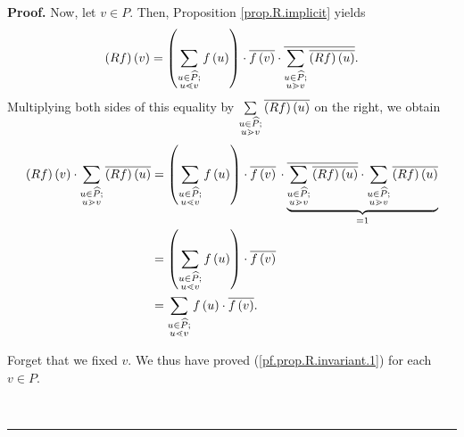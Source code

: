 \documentclass[numbers=enddot,12pt,final,onecolumn,notitlepage]{scrartcl}%
\theoremstyle{definition}
\newenvironment{verlong}{}{}
\newenvironment{proof}[1][Proof]{\noindent\textbf{#1.} }{\ \rule{0.5em}{0.5em}}
\let\sumnonlimits\sum
\renewcommand{\sum}{\sumnonlimits\limits}
\begin{document}
\begin{verlong}
\begin{proof}
Now, let $v\in P$. Then, Proposition \ref{prop.R.implicit} yields%
\[
\left(  Rf\right)  \left(  v\right)  =\left(  \sum\limits_{\substack{u\in
\widehat{P};\\u\lessdot v}}f\left(  u\right)  \right)  \cdot\overline{f\left(
v\right)  }\cdot\overline{\sum\limits_{\substack{u\in\widehat{P};\\u\gtrdot
v}}\overline{\left(  Rf\right)  \left(  u\right)  }}.
\]
Multiplying both sides of this equality by $\sum\limits_{\substack{u\in
\widehat{P};\\u\gtrdot v}}\overline{\left(  Rf\right)  \left(  u\right)  }$ on
the right, we obtain%
\begin{align}
\left(  Rf\right)  \left(  v\right)  \cdot\sum\limits_{\substack{u\in
\widehat{P};\\u\gtrdot v}}\overline{\left(  Rf\right)  \left(  u\right)  }  &
=\left(  \sum\limits_{\substack{u\in\widehat{P};\\u\lessdot v}}f\left(
u\right)  \right)  \cdot\overline{f\left(  v\right)  }\,\cdot
\underbrace{\overline{\sum\limits_{\substack{u\in\widehat{P};\\u\gtrdot
v}}\overline{\left(  Rf\right)  \left(  u\right)  }}\cdot\sum
\limits_{\substack{u\in\widehat{P};\\u\gtrdot v}}\overline{\left(  Rf\right)
\left(  u\right)  }}_{=1}\nonumber\\
&  =\left(  \sum\limits_{\substack{u\in\widehat{P};\\u\lessdot v}}f\left(
u\right)  \right)  \cdot\overline{f\left(  v\right)  }\nonumber\\
&  =\sum_{\substack{u\in\widehat{P};\\u\lessdot v}}f\left(  u\right)
\cdot\overline{f\left(  v\right)  }. \label{pf.prop.R.invariant.1}%
\end{align}


Forget that we fixed $v$. We thus have proved (\ref{pf.prop.R.invariant.1})
for each $v\in P$.


\end{proof}
\end{verlong}
\end{document}
